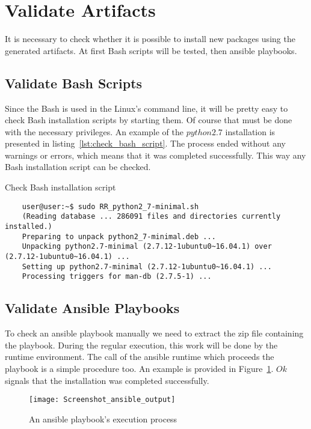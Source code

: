 \section{Validate Artifacts}\label{sec:checkart}
It is necessary to check whether it is possible to install new packages using the generated artifacts.
At first Bash scripts will be tested, then ansible playbooks.

\subsection*{Validate Bash Scripts}
Since the Bash is used in the Linux's command line, it will be pretty easy to check Bash installation scripts by starting them.
Of course that must be done with the necessary privileges.
An example of the $python2.7$ installation is presented in listing~\ref{lst:check_bash_script}. %
The process ended without any warnings or errors, which means that it was completed successfully.
This way any Bash installation script can be checked.
\begin{Listing}
	\caption{Check Bash installation script}
	\label{lst:check_bash_script}
	\begin{lstlisting}
	user@user:~$ sudo RR_python2_7-minimal.sh 
	(Reading database ... 286091 files and directories currently installed.)
	Preparing to unpack python2_7-minimal.deb ...
	Unpacking python2.7-minimal (2.7.12-1ubuntu0~16.04.1) over (2.7.12-1ubuntu0~16.04.1) ...
	Setting up python2.7-minimal (2.7.12-1ubuntu0~16.04.1) ...
	Processing triggers for man-db (2.7.5-1) ...
	\end{lstlisting}
\end{Listing}

\subsection*{Validate Ansible Playbooks}
To check an ansible playbook manually we need to extract the zip file containing the playbook. 
During the regular execution, this work will be done by the runtime environment.
The call of the ansible runtime which proceeds the playbook is a simple procedure too.
An example is provided in Figure~\ref{fig:ansible_output2}. %
$Ok$ signals that the installation was completed successfully.
\begin{figure}[ht]   
	\centering
	\texttt{[image: Screenshot\_ansible\_output]}
	\caption{An ansible playbook's execution process}
	\label{fig:ansible_output2}
\end{figure}